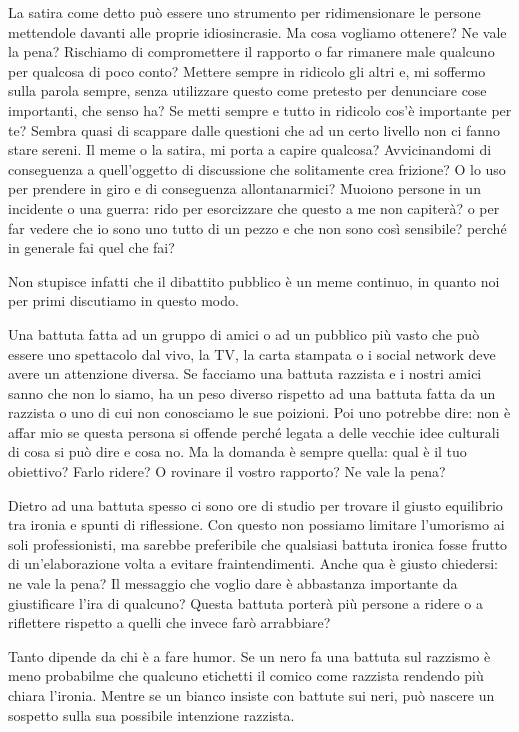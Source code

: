 \documentclass[12pt]{book} %
\begin{document}
\begin{mdframed}[linewidth=1pt]
La satira come detto può essere uno strumento per ridimensionare le persone mettendole davanti alle proprie idiosincrasie. Ma cosa vogliamo ottenere? Ne vale la pena? Rischiamo di compromettere il rapporto o far rimanere male qualcuno per qualcosa di poco conto? Mettere sempre in ridicolo gli altri e, mi soffermo sulla parola sempre, senza utilizzare questo come pretesto per denunciare cose importanti, che senso ha? Se metti sempre e tutto in ridicolo cos'è importante per te? Sembra quasi di scappare dalle questioni che ad un certo livello non ci fanno stare sereni.
Il meme o la satira, mi porta a capire qualcosa? Avvicinandomi di conseguenza a quell'oggetto di discussione che solitamente crea frizione? O lo uso per prendere in giro e di conseguenza allontanarmici? Muoiono persone in un incidente o una guerra: rido per esorcizzare che questo a me non capiterà? o per far vedere che io sono uno tutto di un pezzo e che non sono così sensibile? perché in generale fai quel che fai?

Non stupisce infatti che il dibattito pubblico è un meme continuo, in quanto noi per primi discutiamo in questo modo.

Una battuta fatta ad un gruppo di amici o ad un pubblico più vasto che può essere uno spettacolo dal vivo, la TV, la
carta stampata o i social network deve avere un attenzione diversa. Se facciamo una battuta razzista e i nostri amici sanno che non lo siamo, ha un peso diverso
rispetto ad una battuta fatta da un razzista o uno di cui non conosciamo le sue poizioni. Poi uno potrebbe dire: non è affar mio se questa persona si
offende perché legata a delle vecchie idee culturali di cosa si può dire e cosa no. Ma la domanda è sempre quella: qual è il tuo obiettivo? Farlo ridere? O rovinare il vostro rapporto? Ne vale la pena?

Dietro ad una battuta spesso ci sono ore di studio per trovare il giusto equilibrio tra ironia e spunti di riflessione. Con questo non possiamo limitare l'umorismo ai soli professionisti, ma sarebbe preferibile che qualsiasi battuta ironica fosse frutto di un'elaborazione volta a evitare fraintendimenti. Anche qua è giusto chiedersi: ne vale la pena? Il messaggio che voglio dare è abbastanza importante da giustificare l'ira di qualcuno? Questa battuta porterà più persone a ridere o a riflettere rispetto a quelli che invece farò arrabbiare?

Tanto dipende da chi è a fare humor. Se un nero fa una battuta sul razzismo è meno probabilme che qualcuno etichetti il comico come razzista rendendo più chiara l'ironia. Mentre se un bianco insiste con battute sui neri, può nascere un sospetto sulla sua possibile intenzione razzista.


\end{mdframed}
\end{document}
